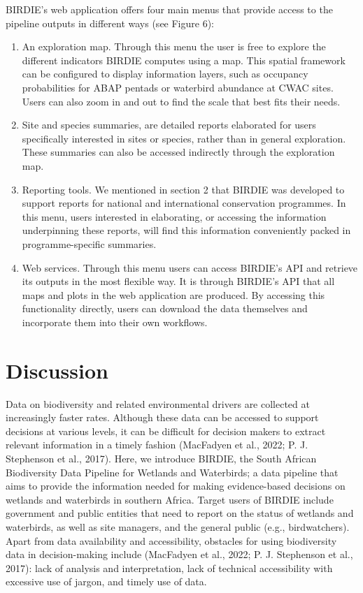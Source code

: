 \documentclass[utf8]{frontiersSCNS}
\begin{document}
BIRDIE's web application offers four main menus that provide access to
the pipeline outputs in different ways (see Figure 6):

\begin{enumerate}
\def\labelenumi{\arabic{enumi}.}
\item
  An exploration map. Through this menu the user is free to explore the
  different indicators BIRDIE computes using a map. This spatial
  framework can be configured to display information layers, such as
  occupancy probabilities for ABAP pentads or waterbird abundance at
  CWAC sites. Users can also zoom in and out to find the scale that best
  fits their needs.
\item
  Site and species summaries, are detailed reports elaborated for users
  specifically interested in sites or species, rather than in general
  exploration. These summaries can also be accessed indirectly through
  the exploration map.
\item
  Reporting tools. We mentioned in section 2 that BIRDIE was developed
  to support reports for national and international conservation
  programmes. In this menu, users interested in elaborating, or
  accessing the information underpinning these reports, will find this
  information conveniently packed in programme-specific summaries.
\item
  Web services. Through this menu users can access BIRDIE's API and
  retrieve its outputs in the most flexible way. It is through BIRDIE's
  API that all maps and plots in the web application are produced. By
  accessing this functionality directly, users can download the data
  themselves and incorporate them into their own workflows.
\end{enumerate}

\hypertarget{discussion}{%
\section*{Discussion}\label{discussion}}

Data on biodiversity and related environmental drivers are collected at
increasingly faster rates. Although these data can be accessed to
support decisions at various levels, it can be difficult for decision
makers to extract relevant information in a timely fashion (MacFadyen et
al., 2022; P. J. Stephenson et al., 2017). Here, we introduce BIRDIE,
the South African Biodiversity Data Pipeline for Wetlands and
Waterbirds; a data pipeline that aims to provide the information needed
for making evidence-based decisions on wetlands and waterbirds in
southern Africa. Target users of BIRDIE include government and public
entities that need to report on the status of wetlands and waterbirds,
as well as site managers, and the general public (e.g., birdwatchers).
Apart from data availability and accessibility, obstacles for using
biodiversity data in decision-making include (MacFadyen et al., 2022; P.
J. Stephenson et al., 2017): lack of analysis and interpretation, lack
of technical accessibility with excessive use of jargon, and timely use
of data.
\end{document}
